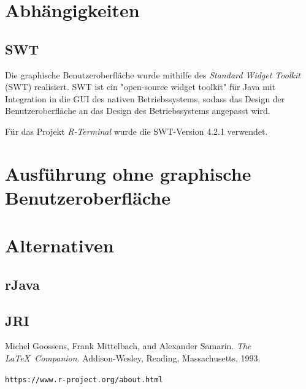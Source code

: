 \documentclass[a4paper, 12pt]{report} %
\begin{document}
\section{Abhängigkeiten}

\subsection{SWT}\label{swt} 
Die graphische Benutzeroberfläche wurde mithilfe des \textit{Standard Widget Toolkit} (SWT) realisiert. SWT ist ein "open-source widget toolkit" für Java mit Integration in die GUI des nativen Betriebssystems, sodass das Design der Benutzeroberfläche an das Design des Betriebssystems angepasst wird. 

Für das Projekt \textit{R-Terminal} wurde die SWT-Version 4.2.1 verwendet.

\section{Ausführung ohne graphische Benutzeroberfläche}

\section{Alternativen}
\subsection{rJava}
\subsection{JRI}






%

%
\begin{thebibliography}{9} %
Michel Goossens, Frank Mittelbach, and Alexander Samarin. 
\textit{The \LaTeX\ Companion}. 
Addison-Wesley, Reading, Massachusetts, 1993.
 

 
\texttt{https://www.r-project.org/about.html}
\end{thebibliography}
\end{document}
